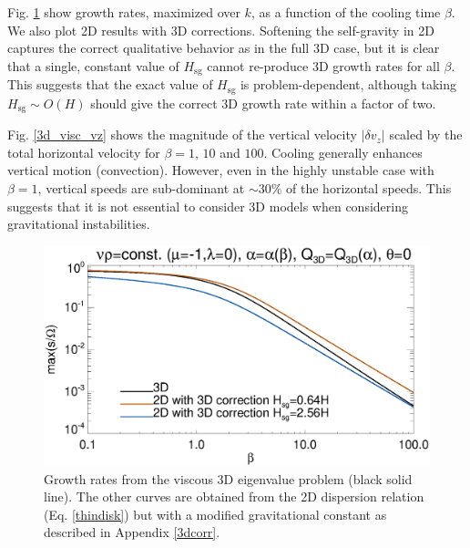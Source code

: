 Fig. \ref{3d_visc} show growth rates, maximized over $k$, as a
function of the cooling time $\beta$. We also plot 2D results with 3D
corrections. Softening the self-gravity in 2D captures the correct 
qualitative behavior as in the full 3D case, but it is clear that a
single, constant value of $H_\mathrm{sg}$ cannot re-produce 3D growth 
rates for all $\beta$. 
This suggests that the exact value of
$H_\mathrm{sg}$ is problem-dependent, although taking
$H_\mathrm{sg}\sim O(H)$ should give the correct 3D growth rate within
a factor of two. 

Fig. \ref{3d_visc_vz} shows the magnitude of the vertical velocity
$|\delta v_z|$ scaled by the total horizontal velocity for $\beta =
1,\,10$ and $100$. Cooling generally enhances vertical motion
(convection). However, even in the highly unstable case with $\beta=1$,
vertical speeds are sub-dominant at $\sim 30\%$ of the horizontal
speeds. This suggests that it is not essential to consider 3D models
when considering gravitational instabilities. 

\begin{figure}
  \includegraphics[width=\linewidth,clip=true,trim=0cm 0.cm 0.23cm
    0.0cm]{figures/growth_visc3d}
  \caption{Growth rates from the viscous 3D eigenvalue problem (black solid
    line). The other curves are obtained from the 2D dispersion
    relation (Eq. \ref{thindisk}) but with a modified gravitational
    constant as described in Appendix \ref{3dcorr}. \label{3d_visc}}
\end{figure}



